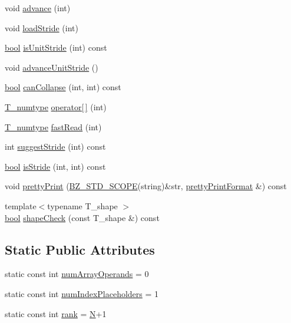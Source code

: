 \begin{DoxyCompactItemize}
\item 
void \hyperlink{classIndexPlaceholder_a16850cce106784fb1db38556c67a77be}{advance} (int)
\item 
void \hyperlink{classIndexPlaceholder_ad1f17f836a3f623628c93ca3eaf8dc4e}{load\+Stride} (int)
\item 
\hyperlink{compiler_8h_abb452686968e48b67397da5f97445f5b}{bool} \hyperlink{classIndexPlaceholder_aae5c77dbbee3215e7dedddf9622f177a}{is\+Unit\+Stride} (int) const 
\item 
void \hyperlink{classIndexPlaceholder_a6e7adfa1ba0172b057be6d92a9425540}{advance\+Unit\+Stride} ()
\item 
\hyperlink{compiler_8h_abb452686968e48b67397da5f97445f5b}{bool} \hyperlink{classIndexPlaceholder_abd6aa298ec85691787f14fe764aa88f5}{can\+Collapse} (int, int) const 
\item 
\hyperlink{classIndexPlaceholder_ad03df79ee5a3bed19e6a8de0dd67cc16}{T\+\_\+numtype} \hyperlink{classIndexPlaceholder_a8f09bece1639edcc4d1f1359ebfcedc6}{operator\mbox{[}$\,$\mbox{]}} (int)
\item 
\hyperlink{classIndexPlaceholder_ad03df79ee5a3bed19e6a8de0dd67cc16}{T\+\_\+numtype} \hyperlink{classIndexPlaceholder_a323f42ec5930b34d734f3ba65ca9cd94}{fast\+Read} (int)
\item 
int \hyperlink{classIndexPlaceholder_a8c8d3605b517912de9fde1a0e075f7f4}{suggest\+Stride} (int) const 
\item 
\hyperlink{compiler_8h_abb452686968e48b67397da5f97445f5b}{bool} \hyperlink{classIndexPlaceholder_a76daa7a41da0f77b9a2d913a4561bda0}{is\+Stride} (int, int) const 
\item 
void \hyperlink{classIndexPlaceholder_a35afaaafc252685aec371a43b0732542}{pretty\+Print} (\hyperlink{numinquire_8h_a2b24ffc3b4ef9803956bc7715c6c7b83}{B\+Z\+\_\+\+S\+T\+D\+\_\+\+S\+C\+O\+P\+E}(string)\&str, \hyperlink{classprettyPrintFormat}{pretty\+Print\+Format} \&) const 
\item 
{\footnotesize template$<$typename T\+\_\+shape $>$ }\\\hyperlink{compiler_8h_abb452686968e48b67397da5f97445f5b}{bool} \hyperlink{classIndexPlaceholder_a3c0bb56125e445181315e99584a3062e}{shape\+Check} (const T\+\_\+shape \&) const 
\end{DoxyCompactItemize}
\subsection*{Static Public Attributes}
\begin{DoxyCompactItemize}
\item 
static const int \hyperlink{classIndexPlaceholder_a4a6c89e6f365e00f6b772cda2899bae2}{num\+Array\+Operands} = 0
\item 
static const int \hyperlink{classIndexPlaceholder_a714db33b62851f95a15d3ab461156657}{num\+Index\+Placeholders} = 1
\item 
static const int \hyperlink{classIndexPlaceholder_aefaf88de12441fffbf9dfd800805bb75}{rank} = \hyperlink{polmisc_8c_a0240ac851181b84ac374872dc5434ee4}{N}+1
\end{DoxyCompactItemize}


